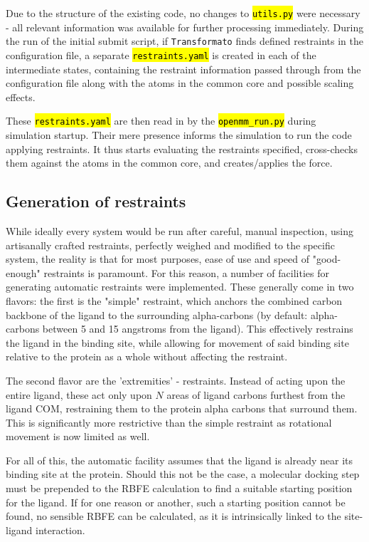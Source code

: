 \documentclass[oneside]{scrreprt}
\newcommand{\code}[1]{\texttt{\hl{#1}}}
\begin{document}
Due to the structure of the existing code, no changes to \code{utils.py} were necessary - all relevant information was available for further processing immediately. During the run of the initial submit script, if \texttt{Transformato} finds defined restraints in the configuration file, a separate \code{restraints.yaml} is created in each of the intermediate states, containing the restraint information passed through from the configuration file along with the atoms in the common core and possible scaling effects.

These \code{restraints.yaml} are then read in by the \code{openmm\_run.py} during simulation startup. Their mere presence informs the simulation to run the code applying restraints. It thus starts evaluating the restraints specified, cross-checks them against the atoms in the common core, and creates/applies the force.

\subsection{Generation of restraints}
While ideally every system would be run after careful, manual inspection, using artisanally crafted restraints, perfectly weighed and modified to the specific system, the reality is that for most purposes, ease of use and speed of "good-enough" restraints is paramount. For this reason, a number of facilities for generating automatic restraints were implemented. These generally come in two flavors: the first is the "simple" restraint, which anchors the combined carbon backbone of the ligand to the surrounding alpha-carbons (by default: alpha-carbons between 5 and 15 angstroms from the ligand). This effectively restrains the ligand in the binding site, while allowing for movement of said binding site relative to the protein as a whole without affecting the restraint.

The second flavor are the 'extremities' - restraints. Instead of acting upon the entire ligand, these act only upon $N$ areas of ligand carbons furthest from the ligand COM, restraining them to the protein alpha carbons that surround them. This is significantly more restrictive than the simple restraint as rotational movement is now limited as well.

For all of this, the automatic facility assumes that the ligand is already near its binding site at the protein. Should this not be the case, a molecular docking step must be prepended to the RBFE calculation to find a suitable starting position for the ligand. If for one reason or another, such a starting position cannot be found, no sensible RBFE can be calculated, as it is intrinsically linked to the site-ligand interaction.
\end{document}
